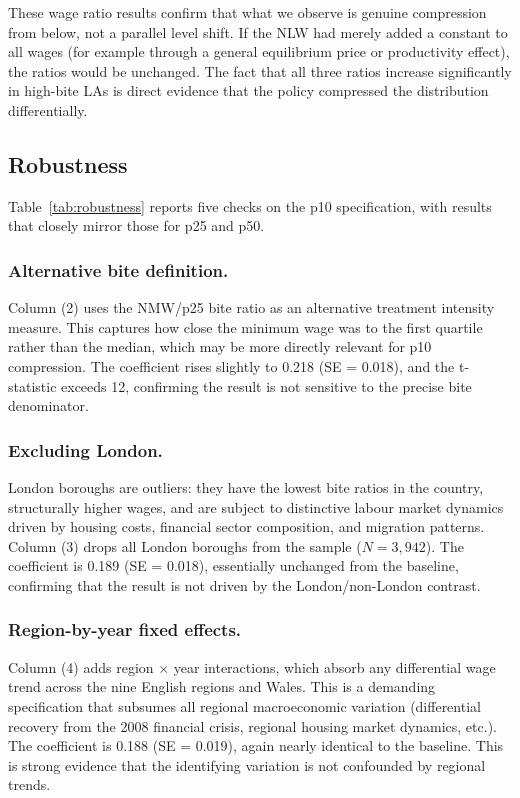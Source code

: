 \documentclass[12pt]{article}
\begin{document}
These wage ratio results confirm that what we observe is genuine compression from below, not a parallel level shift. If the NLW had merely added a constant to all wages (for example through a general equilibrium price or productivity effect), the ratios would be unchanged. The fact that all three ratios increase significantly in high-bite LAs is direct evidence that the policy compressed the distribution differentially.

\subsection{Robustness}

Table~\ref{tab:robustness} reports five checks on the p10 specification, with results that closely mirror those for p25 and p50.



\subsubsection*{Alternative bite definition.}
Column (2) uses the NMW/p25 bite ratio as an alternative treatment intensity measure. This captures how close the minimum wage was to the first quartile rather than the median, which may be more directly relevant for p10 compression. The coefficient rises slightly to 0.218 (SE = 0.018), and the t-statistic exceeds 12, confirming the result is not sensitive to the precise bite denominator.

\subsubsection*{Excluding London.}
London boroughs are outliers: they have the lowest bite ratios in the country, structurally higher wages, and are subject to distinctive labour market dynamics driven by housing costs, financial sector composition, and migration patterns. Column (3) drops all London boroughs from the sample ($N = 3{,}942$). The coefficient is 0.189 (SE = 0.018), essentially unchanged from the baseline, confirming that the result is not driven by the London/non-London contrast.

\subsubsection*{Region-by-year fixed effects.}
Column (4) adds region $\times$ year interactions, which absorb any differential wage trend across the nine English regions and Wales. This is a demanding specification that subsumes all regional macroeconomic variation (differential recovery from the 2008 financial crisis, regional housing market dynamics, etc.). The coefficient is 0.188 (SE = 0.019), again nearly identical to the baseline. This is strong evidence that the identifying variation is not confounded by regional trends.
\end{document}

